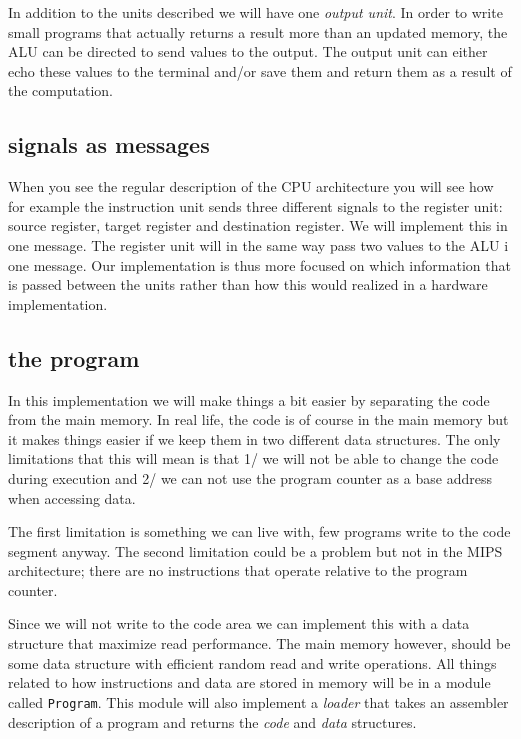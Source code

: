 \documentclass[a4paper,11pt]{article}
\begin{document}
In addition to the units described we will have one {\em output
  unit}. In order to write small programs that actually returns a
result more than an updated memory, the ALU can be directed to send
values to the output. The output unit can either echo these values to
the terminal and/or save them and return them as a result of the
computation.

\subsection{signals as messages}

When you see the regular description of the CPU architecture you will
see how for example the instruction unit sends three different signals to
the register unit: source register, target register and destination register. We will
implement this in one message. The register unit will in the same way
pass two values to the ALU i one message.  Our implementation is thus
more focused on which information that is passed between the units
rather than how this would realized in a hardware implementation.


\subsection{the program}

In this implementation we will make things a bit easier by separating
the code from the main memory. In real life, the code is of course in
the main memory but it makes things easier if we keep them in two
different data structures. The only limitations that this will mean is
that 1/ we will not be able to change the code during execution and 2/
we can not use the program counter as a base address when accessing
data.

The first limitation is something we can live with, few programs write
to the code segment anyway. The second limitation could be a problem but
not in the MIPS architecture; there are no instructions that operate
relative to the program counter.

Since we will not write to the code area we can implement this with a
data structure that maximize read performance. The main memory
however, should be some data structure with efficient random read and
write operations. All things related to how instructions and data are
stored in memory will be in a module called {\tt Program}. This
module will also implement a {\em loader} that takes an assembler
description of a program and returns the {\em code} and {\em data}
structures.
\end{document}
